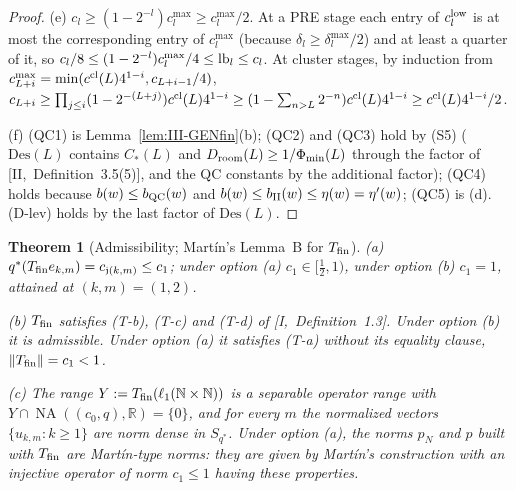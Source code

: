 \documentclass[10pt]{amsart}
\newtheorem{theorem}{Theorem}[section]
\theoremstyle{definition}
\theoremstyle{remark}
\newcommand{\NA}{\operatorname{NA}}
\newcommand{\R}{\mathbb R}
\newcommand{\N}{\mathbb N}
\begin{document}
\begin{proof}
(e) $c_l\ge(1-2^{-l})c^{\max}_l\ge c^{\max}_l/2$.  At a PRE stage each entry of
$c^{\rm low}_l$ is at most the corresponding entry of $c^{\max}_l$ (because
$\delta_l\ge\delta^{\max}_l/2$) and at least a quarter of it, so $c_l/8\le
(1-2^{-l})c^{\max}_l/4\le{\rm lb}_l\le c_l$.  At cluster stages, by induction
from $c^{\max}_{L+i}=\min(c^{\rm cl}(L)4^{1-i},c_{L+i-1}/4)$,
$c_{L+i}\ge\prod_{j\le i}(1-2^{-(L+j)})c^{\rm cl}(L)4^{1-i}\ge(1-\sum_{n>L}2^{-n})
c^{\rm cl}(L)4^{1-i}\ge c^{\rm cl}(L)4^{1-i}/2$.

(f) (QC1) is Lemma~\ref{lem:III-GENfin}(b); (QC2) and (QC3) hold by (S5)
($\mathrm{Des}(L)$ contains $C_*(L)$ and $D_{\rm room}(L)\ge1/\Phi_{\min}(L)$ through
the factor of [II,~Definition~3.5(5)], and the QC constants by the additional
factor); (QC4) holds because $b(w)\le b_{\rm QC}(w)$ and $b(w)\le b_{\rm II}(w)\le
\eta(w)=\eta'(w)$; (QC5) is (d).  (D-lev) holds by the last factor of
$\mathrm{Des}(L)$.
\end{proof}

\begin{theorem}[Admissibility; Mart\'in's Lemma~B for $T_{\rm fin}$]\label{thm:III-Afin}
\textup{(a)} $q^*(T_{\rm fin}e_{k,m})=c_{\mathfrak j(k,m)}\le c_1$; under option
\textup{(a)} $c_1\in[\frac12,1)$, under option \textup{(b)} $c_1=1$, attained at
$(k,m)=(1,2)$.

\textup{(b)} $T_{\rm fin}$ satisfies \textup{(T-b)}, \textup{(T-c)} and
\textup{(T-d)} of [I,~Definition~1.3].  Under option \textup{(b)} it is admissible.
Under option \textup{(a)} it satisfies \textup{(T-a)} without its equality clause,
$\|T_{\rm fin}\|=c_1<1$.

\textup{(c)} The range $Y:=T_{\rm fin}(\ell_1(\N\times\N))$ is a separable operator
range with $Y\cap\NA((c_0,q),\R)=\{0\}$, and for every $m$ the normalized
vectors $\{u_{k,m}:k\ge1\}$ are norm dense in $S_{q^*}$.  Under option
\textup{(a)}, the norms $p_N$ and $p$ built with $T_{\rm fin}$ are Mart\'in-type
norms: they are given by Mart\'in's construction \cite{Martin} with an
injective operator of norm $c_1\le1$ having these properties.
\end{theorem}
\end{document}
